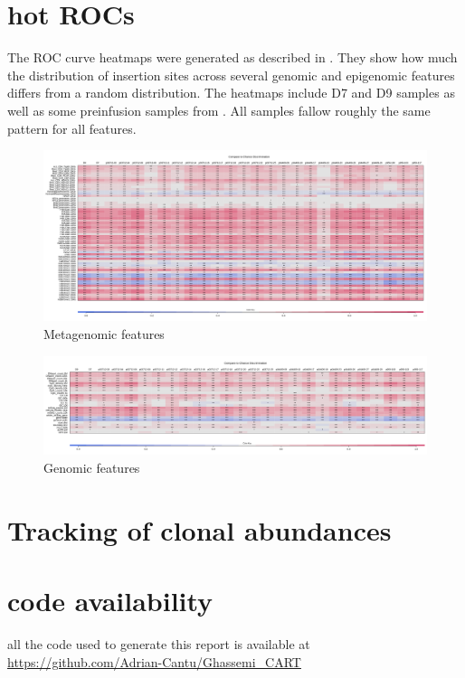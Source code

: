 \documentclass[]{article}
\begin{document}
\newpage

\hypertarget{hot-rocs}{%
\section{hot ROCs}\label{hot-rocs}}

The ROC curve heatmaps were generated as described in \citet{berry2014}.
They show how much the distribution of insertion sites across several
genomic and epigenomic features differs from a random distribution. The
heatmaps include D7 and D9 samples as well as some preinfusion samples
from \citet{nobles2020}. All samples fallow roughly the same pattern for
all features.

\begin{figure}[H]

{\centering \includegraphics[width=1\linewidth]{epiGenHeatMap_ddd/main} 

}

\caption{Metagenomic features}\label{fig:unnamed-chunk-2}
\end{figure}

\begin{figure}[H]

{\centering \includegraphics[width=1\linewidth]{genHeatMap_ddd/main} 

}

\caption{Genomic features}\label{fig:unnamed-chunk-3}
\end{figure}
\newpage

\hypertarget{tracking-of-clonal-abundances}{%
\section{Tracking of clonal
abundances}\label{tracking-of-clonal-abundances}}

\newpage

\hypertarget{code-availability}{%
\section{code availability}\label{code-availability}}

all the code used to generate this report is available at
\url{https://github.com/Adrian-Cantu/Ghassemi_CART}




\newpage
\singlespacing 

\end{document}
